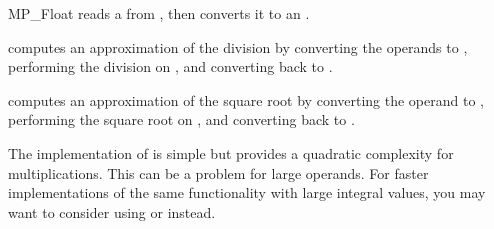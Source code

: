 \begin{ccRefClass} {MP_Float}
{reads a  from , then converts it to an .}

{computes an approximation of the division by converting the operands to
, performing the division on , and converting back to
.}

{computes an approximation of the square root by converting the operand to
, performing the square root on , and converting back
to .}


\ccImplementation 
The implementation of  is simple but provides a quadratic
complexity for multiplications.  This can be a problem for large operands.
For faster implementations of the same functionality with large integral
values, you may want to consider using  or  instead.

\end{ccRefClass} 
